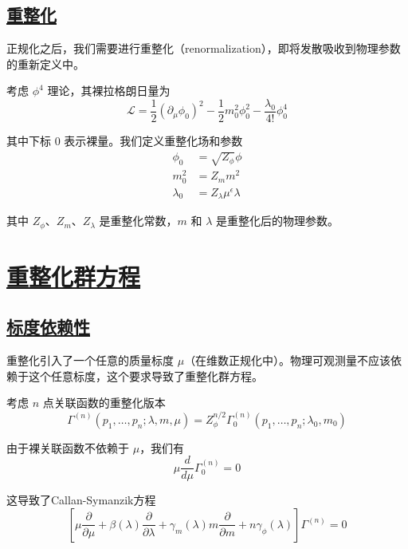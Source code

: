 \subsection{\protect\hyperlink{:}{重整化}}

正规化之后，我们需要进行重整化（renormalization），即将发散吸收到物理参数的重新定义中。

考虑 $\phi^4$ 理论，其裸拉格朗日量为
\begin{equation}
    \mathcal{L} = \frac{1}{2}(\partial_\mu\phi_0)^2 - \frac{1}{2}m_0^2\phi_0^2 - \frac{\lambda_0}{4!}\phi_0^4
\end{equation}

其中下标 $0$ 表示裸量。我们定义重整化场和参数
\begin{align}
    \phi_0 &= \sqrt{Z_\phi}\phi \\
    m_0^2 &= Z_m m^2 \\
    \lambda_0 &= Z_\lambda \mu^{\epsilon} \lambda
\end{align}

其中 $Z_\phi$、$Z_m$、$Z_\lambda$ 是重整化常数，$m$ 和 $\lambda$ 是重整化后的物理参数。

\section{\protect\hyperlink{:}{重整化群方程}}

\subsection{\protect\hyperlink{:}{标度依赖性}}

重整化引入了一个任意的质量标度 $\mu$（在维数正规化中）。物理可观测量不应该依赖于这个任意标度，这个要求导致了重整化群方程。

考虑 $n$ 点关联函数的重整化版本
\begin{equation}
    \Gamma^{(n)}(p_1, \ldots, p_n; \lambda, m, \mu) = Z_\phi^{n/2} \Gamma_0^{(n)}(p_1, \ldots, p_n; \lambda_0, m_0)
\end{equation}

由于裸关联函数不依赖于 $\mu$，我们有
\begin{equation}
    \mu\frac{d}{d\mu}\Gamma_0^{(n)} = 0
\end{equation}

这导致了Callan-Symanzik方程
\begin{equation}
    \left[\mu\frac{\partial}{\partial\mu} + \beta(\lambda)\frac{\partial}{\partial\lambda} + \gamma_m(\lambda)m\frac{\partial}{\partial m} + n\gamma_\phi(\lambda)\right]\Gamma^{(n)} = 0
\end{equation}

